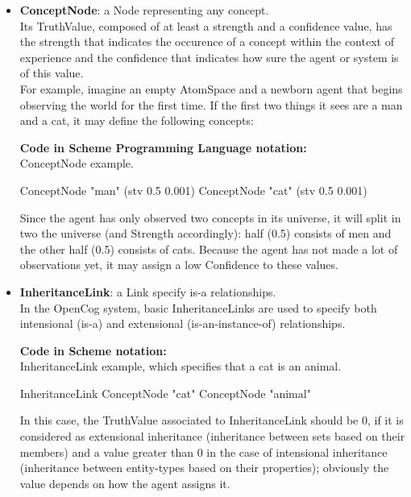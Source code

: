 \begin{itemize}
	\item \textbf{ConceptNode}: a Node representing any concept. \\
Its TruthValue, composed of at least a strength and a confidence value, has the strength that indicates the occurence of a concept within the context of experience and the confidence that indicates how sure the agent or system is of this value. 
\\
For example, imagine an empty AtomSpace and a newborn agent that begins observing the world for the first time. If the first two things it sees are a man and a cat, it may define the following concepts:

\begin{footnotesize}\textbf{Code in Scheme Programming Language notation:} \\
ConceptNode example.\end{footnotesize}
\begin{python}
	ConceptNode "man" (stv 0.5 0.001)
	ConceptNode "cat" (stv 0.5 0.001)
\end{python}

Since the agent has only observed two concepts in its universe, it will split in two the universe (and Strength accordingly): half (0.5) consists of men and the other half (0.5) consists of cats.
Because the agent has not made a lot of observations yet, it may assign a low Confidence to these values.

	\item \textbf{InheritanceLink}: a Link specify is-a relationships. \\
In the OpenCog system, basic InheritanceLinks are used to specify both intensional (is-a) and extensional (is-an-instance-of) relationships.

\begin{footnotesize}\textbf{Code in Scheme notation:} \\
InheritanceLink example, which specifies that a cat is an animal.
\end{footnotesize}
\begin{python}
	InheritanceLink
		ConceptNode "cat"
		ConceptNode "animal"
\end{python}

In this case, the TruthValue associated to InheritanceLink should be 0, if it is considered as extensional inheritance (inheritance between sets based on their members) and a value greater than 0 in the case of intensional inheritance (inheritance between entity-types based on their properties); obviously the value depends on how the agent assigns it.


\end{itemize}
